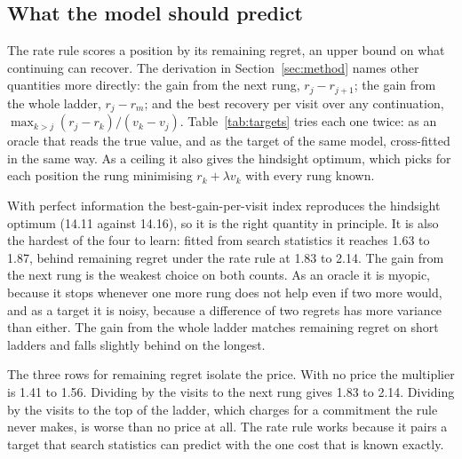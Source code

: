 \subsection{What the model should predict}
\label{sec:targets}

The rate rule scores a position by its remaining regret, an upper bound on what continuing can recover. The derivation in Section~\ref{sec:method} names other quantities more directly: the gain from the next rung, $r_j-r_{j+1}$; the gain from the whole ladder, $r_j-r_m$; and the best recovery per visit over any continuation, $\max_{k>j}(r_j-r_k)/(v_k-v_j)$. Table~\ref{tab:targets} tries each one twice: as an oracle that reads the true value, and as the target of the same model, cross-fitted in the same way. As a ceiling it also gives the hindsight optimum, which picks for each position the rung minimising $r_k+\lambda v_k$ with every rung known.

\begin{table}[t]
\centering\small

\caption{Compute multipliers for different quantities to score at rung $j$ and prices to divide them by ($m$ is the top rung). The oracle column reads the true quantity on the four-rung ladder at a mean cost of 100 visits (at 200 the oracles reach the top of the measurable range). The learned columns fit each quantity with the same model and report a mean cost of 200 visits on three ladders, averaged over three fold assignments.}
\label{tab:targets}
\end{table}

With perfect information the best-gain-per-visit index reproduces the hindsight optimum (14.11 against 14.16), so it is the right quantity in principle. It is also the hardest of the four to learn: fitted from search statistics it reaches 1.63 to 1.87, behind remaining regret under the rate rule at 1.83 to 2.14. The gain from the next rung is the weakest choice on both counts. As an oracle it is myopic, because it stops whenever one more rung does not help even if two more would, and as a target it is noisy, because a difference of two regrets has more variance than either. The gain from the whole ladder matches remaining regret on short ladders and falls slightly behind on the longest.

The three rows for remaining regret isolate the price. With no price the multiplier is 1.41 to 1.56. Dividing by the visits to the next rung gives 1.83 to 2.14. Dividing by the visits to the top of the ladder, which charges for a commitment the rule never makes, is worse than no price at all. The rate rule works because it pairs a target that search statistics can predict with the one cost that is known exactly.

